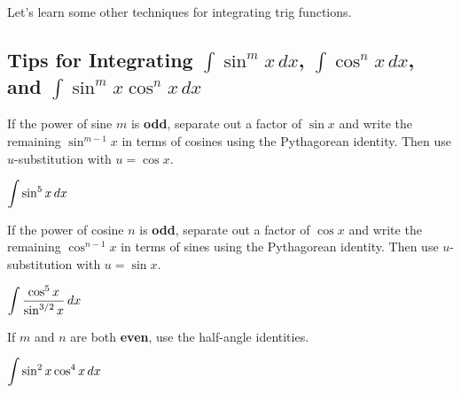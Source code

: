 \documentclass[12pt]{article}
\begin{document}
\vfill

Let's learn some other techniques for integrating trig functions.

\newpage

\subsection*{Tips for Integrating $\int\sin^m x\,dx$, $\int\cos^nx\,dx$, and $\int\sin^m x\cos^n x\,dx$}

If the power of sine $m$ is \textbf{odd}, separate out a factor of $\sin x$ and write the remaining $\sin^{m-1}x$ in terms of cosines using the Pythagorean identity. Then use $u$-substitution with $u=\cos x$.

\Example $\displaystyle\int\sin^5 x\,dx$

\vfill

If the power of cosine $n$ is \textbf{odd}, separate out a factor of $\cos x$ and write the remaining $\cos^{n-1}x$ in terms of sines using the Pythagorean identity. Then use $u$-substitution with $u=\sin x$.

\Example $\displaystyle\int\frac{\cos^5 x}{\sin^{3/2}x}\,dx$

\vfill

\newpage

If $m$ and $n$ are both \textbf{even}, use the half-angle identities.

\Example $\displaystyle\int\sin^2x\cos^4x\,dx$

\newpage

%
%
%
%
%
%
%
%
%
\end{document}
